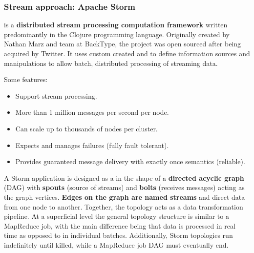 \subsubsection{Stream approach: Apache Storm}

 is a \textbf{distributed stream processing computation framework} written predominantly in the Clojure programming language. Originally created by Nathan Marz and team at BackType, the project was open sourced after being acquired by Twitter. It uses custom created  and  to define information sources and manipulations to allow batch, distributed processing of streaming data.

\highspace
Some features:
\begin{itemize}
    \item Support stream processing.

    \item More than 1 million messages per second per node.

    \item Can scale up to thousands of nodes per cluster.

    \item Expects and manages failures (fully fault tolerant).

    \item Provides guaranteed message delivery with exactly once semantics (reliable).
\end{itemize}
A Storm application is designed as a  in the shape of a \textbf{directed acyclic graph} (DAG) with \textbf{spouts} (source of streams) and \textbf{bolts} (receives messages) acting as the graph vertices. \textbf{Edges on the graph are named streams} and direct data from one node to another. Together, the topology acts as a data transformation pipeline. At a superficial level the general topology structure is similar to a MapReduce job, with the main difference being that data is processed in real time as opposed to in individual batches. Additionally, Storm topologies run indefinitely until killed, while a MapReduce job DAG must eventually end.

